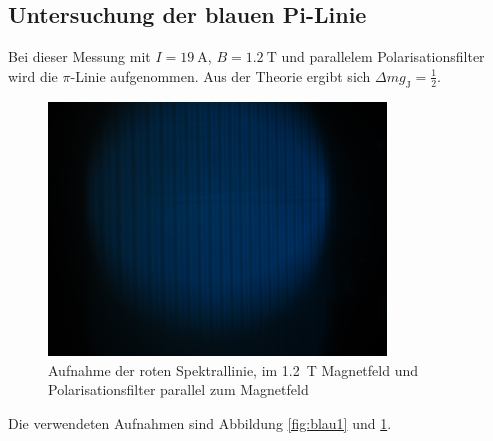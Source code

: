 \subsection{Untersuchung der blauen Pi-Linie}

Bei dieser Messung mit $I = \SI{19}{\ampere}$, $B = \SI{1.2}{\tesla}$ und parallelem Polarisationsfilter wird die $\pi$-Linie aufgenommen. Aus der Theorie ergibt sich $\Delta m g_\text{J} = \frac{1}{2}$.

\begin{figure}
	\centering
	\includegraphics[width=0.8\textwidth]{img/blau-19A-parallel.JPG}
	\caption{Aufnahme der roten Spektrallinie, im \SI{1.2}{\tesla} Magnetfeld und Polarisationsfilter parallel zum Magnetfeld}
	\label{fig:blau3}
\end{figure}
Die verwendeten Aufnahmen sind Abbildung \ref{fig:blau1} und \ref{fig:blau3}.

